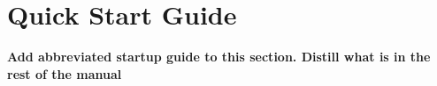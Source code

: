 \chapter{Quick Start Guide}

\textbf{Add abbreviated startup guide to this section. Distill what is in the rest of the manual}